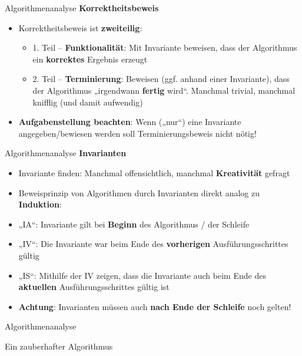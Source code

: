 \begin{frame}{Algorithmenanalyse}
	\textbf{Korrektheitsbeweis} \\[0,125cm]
	\pause
	\begin{itemize}
		\item Korrektheitsbeweis ist \textbf{zweiteilig}:
		\pause
		\begin{itemize}
			\item 1. Teil -- \textbf{Funktionalität}: Mit Invariante beweisen, dass der Algorithmus ein \textbf{korrektes} Ergebnis erzeugt
			\pause
			\item 2. Teil -- \textbf{Terminierung}: Beweisen (ggf. anhand einer Invariante), dass der Algorithmus „irgendwann \textbf{fertig} wird“. Manchmal trivial, manchmal knifflig (und damit aufwendig)
		\end{itemize}
		\pause
		\item \textbf{Aufgabenstellung beachten}: Wenn („nur“) eine Invariante angegeben/bewiesen werden soll \impl Terminierungsbeweis nicht nötig!
	\end{itemize}
\end{frame}

\begin{frame}{Algorithmenanalyse}
	\textbf{Invarianten} \\[0,125cm]
	\pause
	\begin{itemize}
		\item Invariante finden: Manchmal offensichtlich, manchmal \textbf{Kreativität} gefragt
		\pause
		\item Beweisprinzip von Algorithmen durch Invarianten direkt analog zu \textbf{Induktion}:
		\pause
		\item „IA“: Invariante gilt bei \textbf{Beginn} des Algorithmus / der Schleife
		\pause
		\item „IV“: Die Invariante war beim Ende des \textbf{vorherigen} Ausführungsschrittes gültig
		\pause
		\item „IS“: Mithilfe der IV zeigen, dass die Invariante auch beim Ende des \textbf{aktuellen} Ausführungsschrittes gültig ist
		\item \textbf{Achtung}: Invarianten müssen auch \textbf{nach Ende der Schleife} noch gelten!
	\end{itemize}
\end{frame}

\iffalse

\begin{frame}{Algorithmenanalyse}
	\begin{exampleblock}{Ein zauberhafter Algorithmus}
		\begin{algorithm}[H]
			\DontPrintSemicolon
			\footnotesize
		\end{algorithm}
	\end{exampleblock}
\end{frame}



